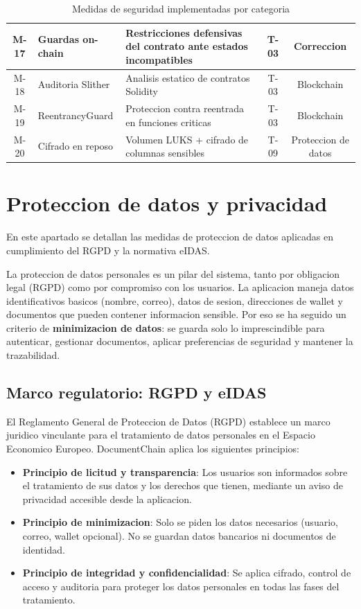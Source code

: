 \documentclass[11pt, a4paper]{article}
\begin{document}
\begin{table}[H]
\begin{tabular}{|c|p{3.5cm}|p{4cm}|c|c|}
\hline
M-17 & Guardas on-chain & Restricciones defensivas del contrato ante estados incompatibles & T-03 & Correccion \\
\hline
M-18 & Auditoria Slither & Analisis estatico de contratos Solidity & T-03 & Blockchain \\
\hline
M-19 & ReentrancyGuard & Proteccion contra reentrada en funciones criticas & T-03 & Blockchain \\
\hline
M-20 & Cifrado en reposo & Volumen LUKS + cifrado de columnas sensibles & T-09 & Proteccion de datos \\
\hline
\end{tabular}
\caption{Medidas de seguridad implementadas por categoria}
\label{tab:medidas}
\end{table}

\section{Proteccion de datos y privacidad}

En este apartado se detallan las medidas de proteccion de datos aplicadas en cumplimiento del RGPD y la normativa eIDAS.

La proteccion de datos personales es un pilar del sistema, tanto por obligacion legal (RGPD) como por compromiso con los usuarios. La aplicacion maneja datos identificativos basicos (nombre, correo), datos de sesion, direcciones de wallet y documentos que pueden contener informacion sensible. Por eso se ha seguido un criterio de \textbf{minimizacion de datos}: se guarda solo lo imprescindible para autenticar, gestionar documentos, aplicar preferencias de seguridad y mantener la trazabilidad.

\subsection{Marco regulatorio: RGPD y eIDAS}

El Reglamento General de Proteccion de Datos (RGPD) establece un marco juridico vinculante para el tratamiento de datos personales en el Espacio Economico Europeo. DocumentChain aplica los siguientes principios:

\begin{itemize}
    \item \textbf{Principio de licitud y transparencia}: Los usuarios son informados sobre el tratamiento de sus datos y los derechos que tienen, mediante un aviso de privacidad accesible desde la aplicacion.
    \item \textbf{Principio de minimizacion}: Solo se piden los datos necesarios (usuario, correo, wallet opcional). No se guardan datos bancarios ni documentos de identidad.
    \item \textbf{Principio de integridad y confidencialidad}: Se aplica cifrado, control de acceso y auditoria para proteger los datos personales en todas las fases del tratamiento.
\end{itemize}
\end{document}
